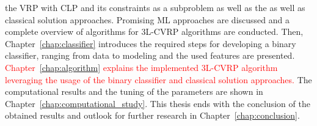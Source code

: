 the \gls{VRP} with CLP and its constraints as a subproblem as well as the as well as classical
solution approaches. Promising \gls{ML} approaches are discussed and a complete overview of algorithms
for \gls{3L-CVRP} algorithms are conducted. Then, Chapter~\ref{chap:classifier} introduces the required
steps for developing a binary classifier, ranging from data to modeling and the used features
are presented. \textcolor{red}{Chapter~\ref{chap:algorithm} explains the implemented \gls{3L-CVRP} algorithm leveraging
    the usage of the binary classifier and classical solution approaches.} The computational results and the
tuning of the parameters are shown in Chapter~\ref{chap:computational_study}. This thesis ends with the conclusion
of the obtained results and outlook for further research in Chapter~\ref{chap:conclusion}.
